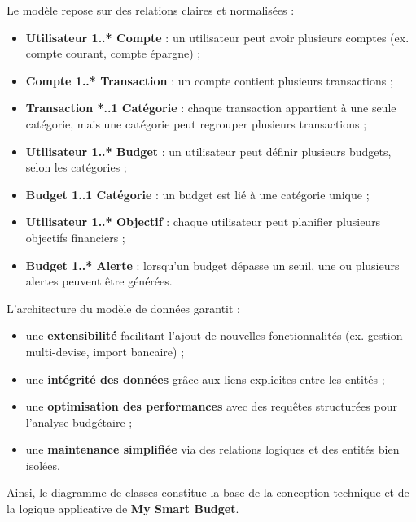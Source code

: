 \begin{tcolorbox}[colback=blue!5!white,colframe=blue!60!black,title=\textbf{Relations entre les entités}]
Le modèle repose sur des relations claires et normalisées :
\begin{itemize}
    \item \textbf{Utilisateur 1..* Compte} : un utilisateur peut avoir plusieurs comptes (ex. compte courant, compte épargne) ;
    \item \textbf{Compte 1..* Transaction} : un compte contient plusieurs transactions ;
    \item \textbf{Transaction *..1 Catégorie} : chaque transaction appartient à une seule catégorie, mais une catégorie peut regrouper plusieurs transactions ;
    \item \textbf{Utilisateur 1..* Budget} : un utilisateur peut définir plusieurs budgets, selon les catégories ;
    \item \textbf{Budget 1..1 Catégorie} : un budget est lié à une catégorie unique ;
    \item \textbf{Utilisateur 1..* Objectif} : chaque utilisateur peut planifier plusieurs objectifs financiers ;
    \item \textbf{Budget 1..* Alerte} : lorsqu’un budget dépasse un seuil, une ou plusieurs alertes peuvent être générées.
\end{itemize}
\end{tcolorbox}

\begin{tcolorbox}[colback=green!5!white,colframe=green!60!black,title=\textbf{Synthèse du modèle}]
L’architecture du modèle de données garantit :
\begin{itemize}
    \item une \textbf{extensibilité} facilitant l’ajout de nouvelles fonctionnalités (ex. gestion multi-devise, import bancaire) ;
    \item une \textbf{intégrité des données} grâce aux liens explicites entre les entités ;
    \item une \textbf{optimisation des performances} avec des requêtes structurées pour l’analyse budgétaire ;
    \item une \textbf{maintenance simplifiée} via des relations logiques et des entités bien isolées.
\end{itemize}

Ainsi, le diagramme de classes constitue la base de la conception technique et de la logique applicative de \textbf{My Smart Budget}.
\end{tcolorbox}

